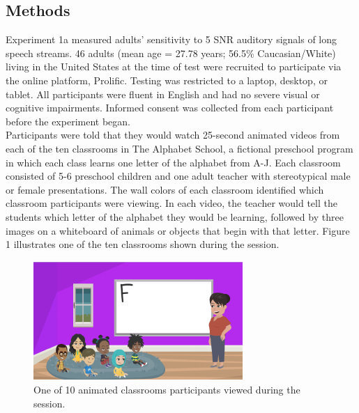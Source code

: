 \documentclass[10pt, letterpaper]{article}
\newenvironment{CodeChunk}{}{}
\begin{document}
\hypertarget{methods}{%
\subsection{\texorpdfstring{\textbf{Methods}}{Methods}}\label{methods}}

Experiment 1a measured adults' sensitivity to 5 SNR auditory signals of
long speech streams. 46 adults (mean age = 27.78 years; 56.5\%
Caucasian/White) living in the United States at the time of test were
recruited to participate via the online platform, Prolific. Testing was
restricted to a laptop, desktop, or tablet. All participants were fluent
in English and had no severe visual or cognitive impairments. Informed
consent was collected from each participant before the experiment
began.\\
Participants were told that they would watch 25-second animated videos
from each of the ten classrooms in The Alphabet School, a fictional
preschool program in which each class learns one letter of the alphabet
from A-J. Each classroom consisted of 5-6 preschool children and one
adult teacher with stereotypical male or female presentations. The wall
colors of each classroom identified which classroom participants were
viewing. In each video, the teacher would tell the students which letter
of the alphabet they would be learning, followed by three images on a
whiteboard of animals or objects that begin with that letter. Figure 1
illustrates one of the ten classrooms shown during the session.

\begin{CodeChunk}
\begin{figure}[H]

{\centering \includegraphics{figs/image 1-1} 

}

\caption[One of 10 animated classrooms participants viewed during the session]{One of 10 animated classrooms participants viewed during the session.}\label{fig:image 1}
\end{figure}
\end{CodeChunk}
\end{document}
